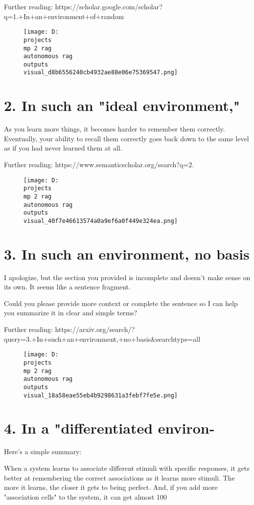 \documentclass[12pt,a4paper]{article}
\begin{document}
Further reading: https://scholar.google.com/scholar?q=1.+In+an+environment+of+random
\begin{figure}[h]
\centering
\texttt{[image: D:\\projects\\mp 2 rag\\autonomous rag\\outputs\\visual\_d8b6556240cb4932ae88e06e75369547.png]}
\end{figure}
\section{2. In such an "ideal environment,"}
As you learn more things, it becomes harder to remember them correctly. Eventually, your ability to recall them correctly goes back down to the same level as if you had never learned them at all.

Further reading: https://www.semanticscholar.org/search?q=2.%
\begin{figure}[h]
\centering
\texttt{[image: D:\\projects\\mp 2 rag\\autonomous rag\\outputs\\visual\_40f7e46613574a0a9ef6a0f449e324ea.png]}
\end{figure}
\section{3. In such an environment, no basis}
I apologize, but the section you provided is incomplete and doesn't make sense on its own. It seems like a sentence fragment.

Could you please provide more context or complete the sentence so I can help you summarize it in clear and simple terms?

Further reading: https://arxiv.org/search/?query=3.+In+such+an+environment,+no+basis&searchtype=all
\begin{figure}[h]
\centering
\texttt{[image: D:\\projects\\mp 2 rag\\autonomous rag\\outputs\\visual\_18a58eae55eb4b9298631a3febf7fe5e.png]}
\end{figure}
\section{4. In a "differentiated environ-}
Here's a simple summary:

When a system learns to associate different stimuli with specific responses, it gets better at remembering the correct associations as it learns more stimuli. The more it learns, the closer it gets to being perfect. And, if you add more "association cells" to the system, it can get almost 100%
\end{document}
